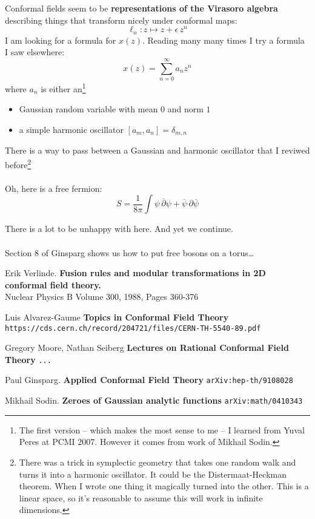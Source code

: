 \documentclass[12pt]{article}
\begin{document}
\newpage

\noindent Conformal fields seem to be \textbf{representations of the Virasoro algebra} describing things that transform nicely under conformal maps:
$$ \ell_n: z \mapsto z + \epsilon \, z^n $$
I am looking for a formula for $x(z)$.  Reading many many times I try a formula I saw elsewhere:
$$ x(z) = \sum_{n = 0}^\infty a_n z^n $$
where $a_n$ is either an\footnote{The first version -- which makes the most sense to me -- I learned from Yuval Peres at PCMI 2007.  However it comes from work of Mikhail Sodin.}
\begin{itemize}
\item Gaussian random variable with mean 0 and norm $1$
\item a simple harmonic oscillator $[a_m, a_n] = \delta_{m, n}$
\end{itemize}
There is a way to pass between a Gaussian and harmonic oscillator that I reviwed before\footnote{There was a trick in symplectic geometry that takes one random walk and turns it into a harmonic oscillator. It could be the Distermaat-Heckman theorem.  When I wrote one thing it magically turned into the other.  This is a linear space, so it's reasonable to assume this will work in infinite dimensions.  } \\ \\
Oh, here is a free fermion:
$$ S = \frac{1}{8\pi} \int \psi \,\overline{\partial}\psi + \overline{\psi} \,\partial \overline{\psi} $$


\newpage

\noindent There is a lot to be unhappy with here.  And yet we continue.\\ \\
Section 8 of Ginsparg shows us how to put free bosons on a torus\dots


\newpage

\selectfont \fontsize{12}{10}\selectfont


\begin{thebibliography}{}

\item Erik Verlinde. \textbf{Fusion rules and modular transformations in 2D conformal field theory.} \\ Nuclear Physics B
Volume 300, 1988, Pages 360-376

\item Luis Alvarez-Gaume \textbf{Topics in Conformal Field Theory} \\ \texttt{https://cds.cern.ch/record/204721/files/CERN-TH-5540-89.pdf}

\item Gregory Moore, Nathan Seiberg \textbf{Lectures on Rational Conformal Field Theory} \texttt{...}

\item Paul Ginsparg.  \textbf{Applied Conformal Field Theory} \texttt{arXiv:hep-th/9108028}

\item Mikhail Sodin. \textbf{Zeroes of Gaussian analytic functions} \texttt{arXiv:math/0410343}


\end{thebibliography}
\end{document}

